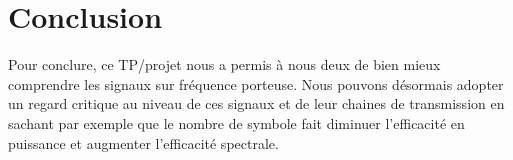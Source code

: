 \documentclass[englishb]{article}
\begin{document}
\section{Conclusion}
Pour conclure, ce TP/projet nous a permis à nous deux de bien mieux comprendre les signaux sur fréquence porteuse. Nous pouvons désormais adopter un regard critique au niveau de ces signaux et de leur chaines de transmission en sachant par exemple que le nombre de symbole fait diminuer l'efficacité en puissance et augmenter l'efficacité spectrale.
\end{document}
